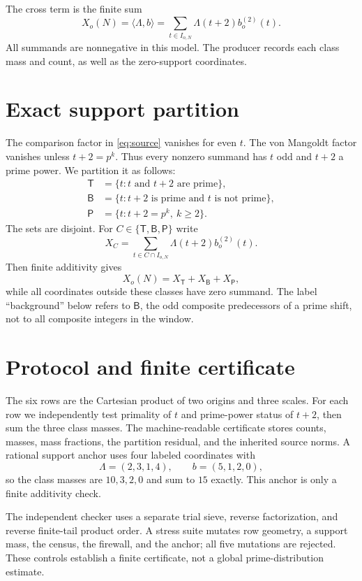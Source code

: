 \documentclass[10pt]{article}
\begin{document}
The cross term is the finite sum
\[
 X_o(N)=\langle\Lambda,b\rangle
       =\sum_{t\in I_{o,N}}\Lambda(t+2)b_o^{(2)}(t).
\]
All summands are nonnegative in this model.  The producer records each class
mass and count, as well as the zero-support coordinates.

\section{Exact support partition}

The comparison factor in \eqref{eq:source} vanishes for even $t$.  The
von Mangoldt factor vanishes unless $t+2=p^k$.  Thus every nonzero summand
has $t$ odd and $t+2$ a prime power.  We partition it as follows:
\begin{align*}
 \mathsf T&=\{t:t\text{ and }t+2\text{ are prime}\},\\
 \mathsf B&=\{t:t+2\text{ is prime and }t\text{ is not prime}\},\\
 \mathsf P&=\{t:t+2=p^k,\ k\ge2\}.
\end{align*}
The sets are disjoint.  For $C\in\{\mathsf T,\mathsf B,\mathsf P\}$ write
\[
 X_C=\sum_{t\in C\cap I_{o,N}}\Lambda(t+2)b_o^{(2)}(t).
\]
Then finite additivity gives
\begin{equation}\label{eq:partition}
 X_o(N)=X_{\mathsf T}+X_{\mathsf B}+X_{\mathsf P},
\end{equation}
while all coordinates outside these classes have zero summand.  The label
``background'' below refers to $\mathsf B$, the odd composite predecessors of
a prime shift, not to all composite integers in the window.

\section{Protocol and finite certificate}

The six rows are the Cartesian product of two origins and three scales.  For
each row we independently test primality of $t$ and prime-power status of
$t+2$, then sum the three class masses.  The machine-readable certificate
stores counts, masses, mass fractions, the partition residual, and the
inherited source norms.  A rational support anchor uses four labeled
coordinates with
\[
 \Lambda=(2,3,1,4),\qquad b=(5,1,2,0),
\]
so the class masses are $10,3,2,0$ and sum to $15$ exactly.  This anchor is
only a finite additivity check.

The independent checker uses a separate trial sieve, reverse factorization,
and reverse finite-tail product order.  A stress suite mutates row geometry,
a support mass, the census, the firewall, and the anchor; all five mutations
are rejected.  These controls establish a finite certificate, not a global
prime-distribution estimate.
\end{document}
